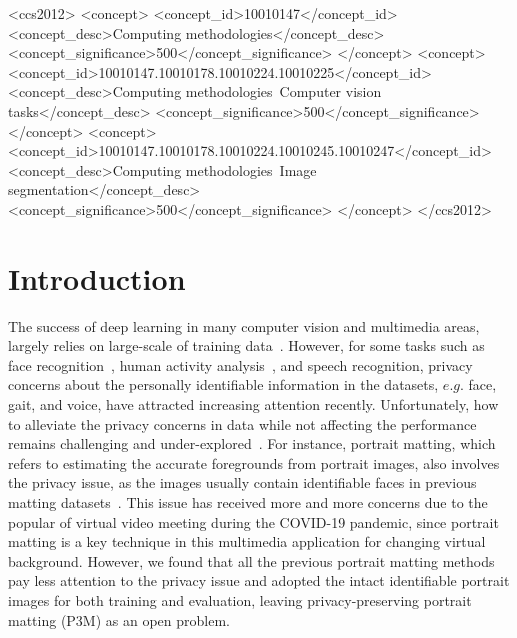 \documentclass[sigconf]{acmart}
\begin{document}
\begin{CCSXML}
<ccs2012>
<concept>
<concept_id>10010147</concept_id>
<concept_desc>Computing methodologies</concept_desc>
<concept_significance>500</concept_significance>
</concept>
<concept>
<concept_id>10010147.10010178.10010224.10010225</concept_id>
<concept_desc>Computing methodologies~Computer vision tasks</concept_desc>
<concept_significance>500</concept_significance>
</concept>
<concept>
<concept_id>10010147.10010178.10010224.10010245.10010247</concept_id>
<concept_desc>Computing methodologies~Image segmentation</concept_desc>
<concept_significance>500</concept_significance>
</concept>
</ccs2012>
\end{CCSXML}



\maketitle

\section{Introduction}
The success of deep learning in many computer vision and multimedia areas, largely relies on large-scale of training data~\cite{zhang2020empowering}. However, for some tasks such as face recognition~\cite{masi2018deep}, human activity analysis~\cite{sun2019deep}, and speech recognition, privacy concerns about the personally identifiable information in the datasets, $e.g.$ face, gait, and voice, have attracted increasing attention recently. Unfortunately, how to alleviate the privacy concerns in data while not affecting the performance remains challenging and under-explored~\cite{yang2021study}. For instance, portrait matting, which refers to estimating the accurate foregrounds from portrait images, also involves the privacy issue, as the images usually contain identifiable faces in previous matting datasets~\cite{dim,hatt,dapm}. This issue has received more and more concerns due to the popular of virtual video meeting during the COVID-19 pandemic, since portrait matting is a key technique in this multimedia application for changing virtual background. However, we found that all the previous portrait matting methods pay less attention to the privacy issue and adopted the intact identifiable portrait images for both training and evaluation, leaving privacy-preserving portrait matting (P3M) as an open problem.
\end{document}
